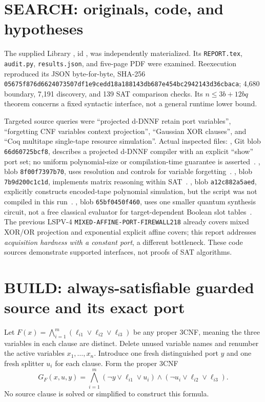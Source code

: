 \documentclass[11pt]{article}
\begin{document}
\section{SEARCH: originals, code, and hypotheses}
The supplied Library , id , was independently materialized. Its \texttt{REPORT.tex}, \texttt{audit.py}, \texttt{results.json}, and five-page PDF were examined. Reexecution reproduced its JSON byte-for-byte, SHA-256 \texttt{05675f876d6624073507df1e9cedd18a188143db687e454bc2942143d36cbaca}; 4,680 boundary, 7,191 discovery, and 139 SAT comparison checks. Its $n\le 3b+12bq$ theorem concerns a fixed syntactic interface, not a general runtime lower bound.

Targeted source queries were ``projected d-DNNF retain port variables'', ``forgetting CNF variables context projection'', ``Gaussian XOR clauses'', and ``Coq multitape single-tape resource simulation''. Actual inspected files: , Git blob \texttt{66d60725bcf8}, describes a projected d-DNNF compiler with an explicit ``show'' port set; no uniform polynomial-size or compilation-time guarantee is asserted~\cite{pd4}. , blob \texttt{8f00f7397b70}, uses resolution and controls for variable forgetting~\cite{d4}. , blob \texttt{7b9d200c1c1d}, implements matrix reasoning within SAT~\cite{cryptominisat}. , blob \texttt{a12c882a5aed}, explicitly constructs encoded-tape polynomial simulation, but the script was not compiled in this run~\cite{coqcomplexity}. , blob \texttt{65bf0450f460}, uses one smaller quantum synthesis circuit, not a free classical evaluator for target-dependent Boolean slot tables~\cite{openai2026}. The previous LSPV-4 \texttt{MIXED-AFFINE-PORT-FIREWALL218} already covers mixed XOR/OR projection and exponential explicit affine covers; this report addresses \emph{acquisition hardness with a constant port}, a different bottleneck. These code sources demonstrate supported interfaces, not proofs of SAT algorithms.

\section{BUILD: always-satisfiable guarded source and its exact port}
Let $F(x)=\bigwedge_{i=1}^{m}(\ell_{i1}\vee\ell_{i2}\vee\ell_{i3})$ be any proper 3CNF, meaning the three variables in each clause are distinct. Delete unused variable names and renumber the active variables $x_1,\ldots,x_n$. Introduce one fresh distinguished port $y$ and one fresh splitter $u_i$ for each clause. Form the proper 3CNF
\begin{equation}\label{eq:gated}
 \boxed{G_F(x,u,y)=\bigwedge_{i=1}^{m}
  (\neg y\vee\ell_{i1}\vee u_i)\wedge
  (\neg u_i\vee\ell_{i2}\vee\ell_{i3}).}
\end{equation}
No source clause is solved or simplified to construct this formula.
\end{document}
